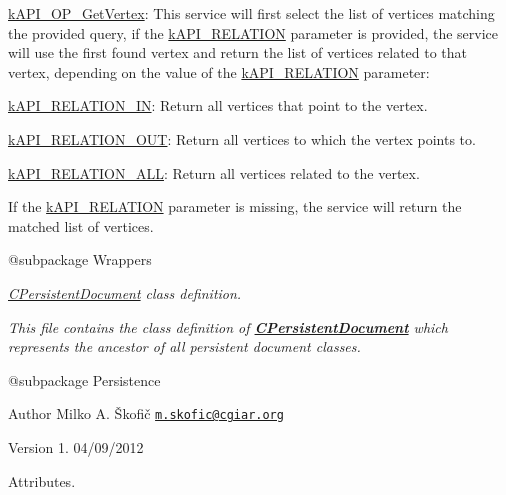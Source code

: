 {\itshape 
\begin{DoxyItemize}
\item {\ttfamily \hyperlink{}{k\-A\-P\-I\-\_\-\-O\-P\-\_\-\-Get\-Vertex}}\-: This service will first select the list of vertices matching the provided query, if the \hyperlink{}{k\-A\-P\-I\-\_\-\-R\-E\-L\-A\-T\-I\-O\-N} parameter is provided, the service will use the first found vertex and return the list of vertices related to that vertex, depending on the value of the \hyperlink{}{k\-A\-P\-I\-\_\-\-R\-E\-L\-A\-T\-I\-O\-N} parameter\-: 
\begin{DoxyItemize}
\item {\ttfamily \hyperlink{}{k\-A\-P\-I\-\_\-\-R\-E\-L\-A\-T\-I\-O\-N\-\_\-\-I\-N}}\-: Return all vertices that point to the vertex. 
\item {\ttfamily \hyperlink{}{k\-A\-P\-I\-\_\-\-R\-E\-L\-A\-T\-I\-O\-N\-\_\-\-O\-U\-T}}\-: Return all vertices to which the vertex points to. 
\item {\ttfamily \hyperlink{}{k\-A\-P\-I\-\_\-\-R\-E\-L\-A\-T\-I\-O\-N\-\_\-\-A\-L\-L}}\-: Return all vertices related to the vertex. 
\end{DoxyItemize}If the \hyperlink{}{k\-A\-P\-I\-\_\-\-R\-E\-L\-A\-T\-I\-O\-N} parameter is missing, the service will return the matched list of vertices. 
\end{DoxyItemize}}

{\itshape \begin{DoxyVerb} @subpackage        Wrappers\end{DoxyVerb}
}

{\itshape {\itshape \hyperlink{class_c_persistent_document}{C\-Persistent\-Document}} class definition.}

{\itshape This file contains the class definition of {\bfseries \hyperlink{class_c_persistent_document}{C\-Persistent\-Document}} which represents the ancestor of all persistent document classes.}

{\itshape \begin{DoxyVerb} @subpackage        Persistence
\end{DoxyVerb}
}

{\itshape \begin{DoxyAuthor}{Author}
Milko A. Škofič \href{mailto:m.skofic@cgiar.org}{\tt m.\-skofic@cgiar.\-org} 
\end{DoxyAuthor}
\begin{DoxyVersion}{Version}
1. 04/09/2012
\end{DoxyVersion}
Attributes.}

